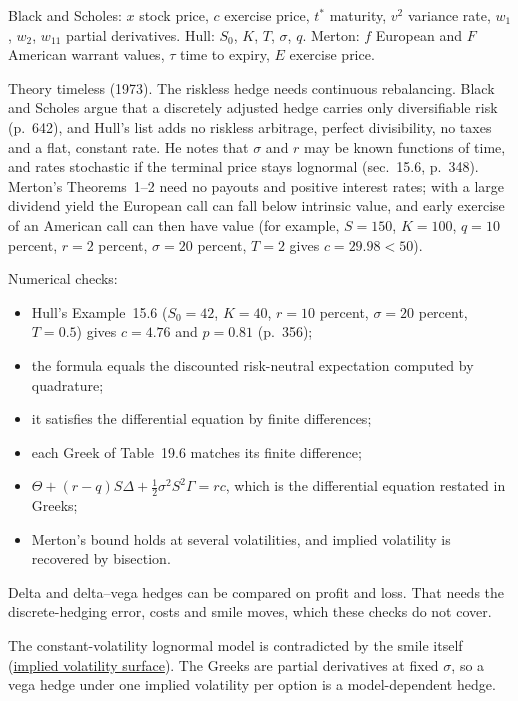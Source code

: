 \begin{qfmodel}
 Black and Scholes: $x$ stock price, $c$ exercise price, $t^*$ maturity, $v^2$ variance rate, $w_1$, $w_2$, $w_{11}$ partial derivatives. Hull: $S_0$, $K$, $T$, $\sigma$, $q$. Merton: $f$ European and $F$ American warrant values, $\tau$ time to expiry, $E$ exercise price.

 Theory timeless (1973). The riskless hedge needs continuous rebalancing. Black and Scholes argue that a discretely adjusted hedge carries only diversifiable risk (p.~642), and Hull's list adds no riskless arbitrage, perfect divisibility, no taxes and a flat, constant rate. He notes that $\sigma$ and $r$ may be known functions of time, and rates stochastic if the terminal price stays lognormal (sec.~15.6, p.~348). Merton's Theorems~1--2 need no payouts and positive interest rates; with a large dividend yield the European call can fall below intrinsic value, and early exercise of an American call can then have value (for example, $S=150$, $K=100$, $q=10$ percent, $r=2$ percent, $\sigma=20$ percent, $T=2$ gives $c=29.98<50$).

 Numerical checks:
\begin{itemize}
\item Hull's Example~15.6 ($S_0=42$, $K=40$, $r=10$ percent, $\sigma=20$ percent, $T=0.5$) gives $c=4.76$ and $p=0.81$ (p.~356);
\item the formula equals the discounted risk-neutral expectation computed by quadrature;
\item it satisfies the differential equation by finite differences;
\item each Greek of Table~19.6 matches its finite difference;
\item $\Theta+(r-q)S\Delta+\frac12\sigma^2S^2\Gamma=rc$, which is the differential equation restated in Greeks;
\item Merton's bound holds at several volatilities, and implied volatility is recovered by bisection.
\end{itemize}
Delta and delta--vega hedges can be compared on profit and loss. That needs the discrete-hedging error, costs and smile moves, which these checks do not cover.

 The constant-volatility lognormal model is contradicted by the smile itself (\hyperref[def:implied-volatility-surface]{implied volatility surface}). The Greeks are partial derivatives at fixed $\sigma$, so a vega hedge under one implied volatility per option is a model-dependent hedge.


\end{qfmodel}
